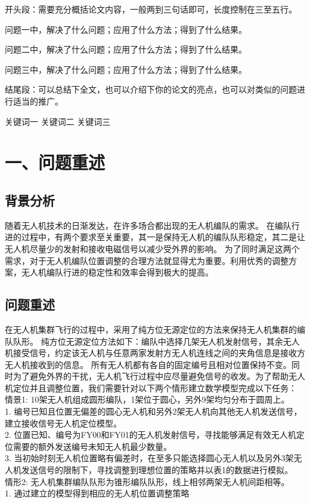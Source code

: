 \documentclass{my_paper}
\begin{document}
\newpage

\begin{center}
\lunwenbiaoti

\vspace{2ex}
\zhaiyao
\end{center}

开头段：需要充分概括论文内容，一般两到三句话即可，长度控制在三至五行。

问题一中，解决了什么问题；应用了什么方法；得到了什么结果。

问题二中，解决了什么问题；应用了什么方法；得到了什么结果。

问题三中，解决了什么问题；应用了什么方法；得到了什么结果。

结尾段：可以总结下全文，也可以介绍下你的论文的亮点，也可以对类似的问题进行适当的推广。

\begin{guanjianci}
关键词一 \quad 关键词二 \quad 关键词三
\end{guanjianci}

\newpage
\section{一、问题重述}
\subsection{背景分析}
随着无人机技术的日渐发达，在许多场合都出现的无人机编队的需求\cite{baca2021mrs}。
在编队行进的过程中，有两个要求至关重要，其一是保持无人机的编队队形稳定，其二是让无人机尽量少的发射和接收电磁信号以减少受外界的影响。
为了同时满足这两个需求，对于无人机编队位置调整的合理方法就显得尤为重要。利用优秀的调整方案，无人机编队行进的稳定性和效率会得到极大的提高。\cite{santos2017indoor}
\subsection{问题重述}
在无人机集群飞行的过程中，采用了纯方位无源定位的方法来保持无人机集群的编队队形。
纯方位无源定位方法如下：编队中选择几架无人机发射信号，其余无人机接受信号，约定该无人机与任意两家发射方无人机连线之间的夹角信息是接收方无人机接收到的信息。
所有无人机都有各自的固定编号且相对位置保持不变。同时为了避免外界的干扰，无人机飞行过程中应尽量避免信号的收发。为了帮助无人机定位并且调整位置，我们需要针对以下两个情形建立数学模型完成以下任务：\\
情景1: 10架无人机组成圆形编队，1架位于圆心，另外9架均匀分布于圆周上。  \\
1. 编号已知且位置无偏差的圆心无人机和另外2架无人机向其他无人机发送信号，建立接收信号无人机定位模型。 \\
2. 位置已知、编号为FY00和FY01的无人机发射信号，寻找能够满足有效无人机定位需要的额外发送编号未知无人机最少数量。 \\
3. 当初始时刻无人机位置略有偏差时，在至多只能选择圆心无人机以及另外3架无人机发送信号的限制下，寻找调整到理想位置的策略并以表1的数据进行模拟。 \\
情形2: 无人机集群编队队形为锥形编队队形，线上相邻两架无人机间距相等。 \\
1. 通过建立的模型得到相应的无人机位置调整策略
\end{document}
